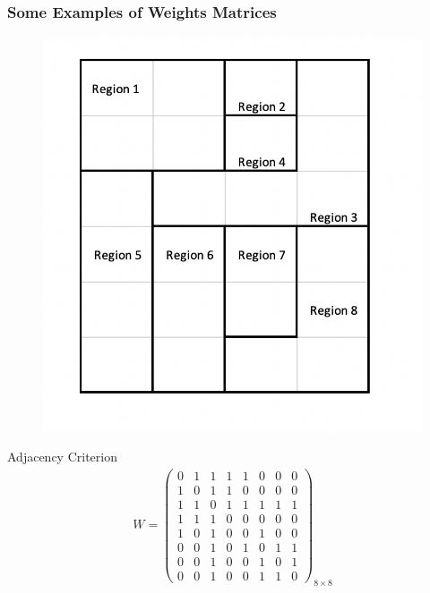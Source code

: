\documentclass[
  shownotes,
  xcolor={svgnames},
  hyperref={colorlinks,citecolor=DarkBlue,linkcolor=DarkRed,urlcolor=DarkBlue}
   , aspectratio=169]{beamer}
\begin{document}
\begin{frame}[fragile]
\frametitle{Some Examples of Weights Matrices}


\begin{minipage}[t]{0.53\linewidth}
  \begin{figure}[H] \centering
    \captionsetup{justification=centering}
    \includegraphics[scale=0.6]{figures/regions_example}
   \end{figure}
  
    \end{minipage}
    \hfill
\begin{minipage}[t]{0.43\linewidth}%
\scriptsize
Adjacency Criterion
\begin{align}
W=\left(\begin{array}{cccccccc}
0 & 1 & 1 & 1 & 1 & 0 & 0 & 0\\
1 & 0 & 1 & 1 & 0 & 0 & 0 & 0\\
1 & 1 & 0 & 1 & 1 & 1 & 1 & 1\\
1 & 1 & 1 & 0 & 0 & 0 & 0 & 0\\
1 & 0 & 1 & 0 & 0 & 1 & 0 & 0\\
0 & 0 & 1 & 0 & 1 & 0 & 1 & 1\\
0 & 0 & 1 & 0 & 0 & 1 & 0 & 1\\
0 & 0 & 1 & 0 & 0 & 1 & 1 & 0
\end{array}\right)_{8\times8} \nonumber
\end{align}
\end{minipage}

\end{frame}
\end{document}
